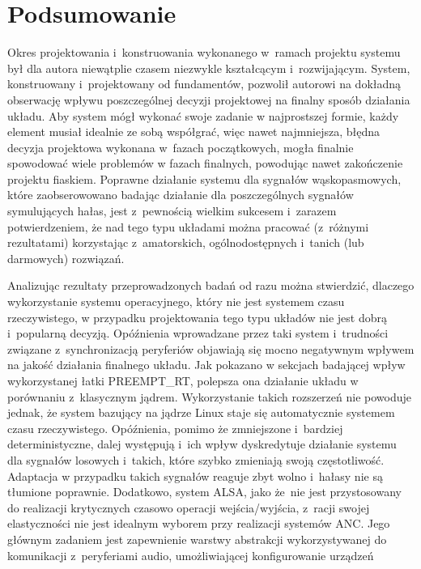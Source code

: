 \chapter{Podsumowanie}


Okres projektowania i~konstruowania wykonanego w~ramach projektu systemu był dla
autora niewątplie czasem niezwykle kształcącym i~rozwijającym. System,
konstruowany i~projektowany od fundamentów, pozwolił autorowi na dokładną
obserwację wpływu poszczególnej decyzji projektowej na finalny sposób działania
układu. Aby system mógł wykonać swoje zadanie w najprostszej formie, każdy
element musiał idealnie ze sobą współgrać, więc nawet najmniejsza, błędna
decyzja projektowa wykonana w~fazach początkowych, mogła finalnie spowodować
wiele problemów w fazach finalnych, powodując nawet zakończenie projektu
fiaskiem. Poprawne działanie systemu dla sygnałów wąskopasmowych, które
zaobserowowano badając działanie dla poszczególnych sygnałów symulujących hałas,
jest z~pewnością wielkim sukcesem i~zarazem potwierdzeniem, że nad tego typu
układami można pracować (z~różnymi rezultatami) korzystając z~amatorskich,
ogólnodostępnych i~tanich (lub darmowych) rozwiązań. \par Analizując rezultaty
przeprowadzonych badań od razu można stwierdzić, dlaczego wykorzystanie systemu
operacyjnego, który nie jest systemem czasu rzeczywistego, w przypadku
projektowania tego typu układów nie jest dobrą i~popularną decyzją. Opóźnienia
wprowadzane przez taki system i~trudności związane z~synchronizacją peryferiów
objawiają się mocno negatywnym wpływem na jakość działania finalnego układu. Jak
pokazano w sekcjach badającej wpływ wykorzystanej łatki PREEMPT\_RT, polepsza
ona działanie układu w porównaniu z~klasycznym jądrem. Wykorzystanie takich
rozszerzeń nie powoduje jednak, że system bazujący na jądrze Linux staje się
automatycznie systemem czasu rzeczywistego. Opóźnienia, pomimo że zmniejszone
i~bardziej deterministyczne, dalej występują i~ich wpływ dyskredytuje działanie
systemu dla sygnałów losowych i~takich, które szybko zmieniają swoją
częstotliwość. Adaptacja w przypadku takich sygnałów reaguje zbyt wolno i~hałasy
nie są tłumione poprawnie. Dodatkowo, system ALSA, jako że~nie jest
przystosowany do realizacji krytycznych czasowo operacji wejścia/wyjścia,
z~racji swojej elastyczności nie jest idealnym wyborem przy realizacji systemów
ANC. Jego głównym zadaniem jest zapewnienie warstwy abstrakcji wykorzystywanej
do komunikacji z~peryferiami audio, umożliwiającej konfigurowanie urządzeń
